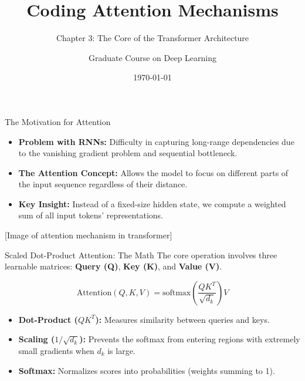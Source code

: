 \documentclass[aspectratio=169]{beamer}
\title{Coding Attention Mechanisms}
\subtitle{Chapter 3: The Core of the Transformer Architecture}
\author{Graduate Course on Deep Learning}
\date{\today}
\institute{Instituto Politécnico Nacional (IPN)}
\begin{document}
	
	\maketitle
	
	\begin{frame}{The Motivation for Attention}
		\begin{itemize}
			\item \textbf{Problem with RNNs:} Difficulty in capturing long-range dependencies due to the vanishing gradient problem and sequential bottleneck.
			\item \textbf{The Attention Concept:} Allows the model to focus on different parts of the input sequence regardless of their distance.
			\item \textbf{Key Insight:} Instead of a fixed-size hidden state, we compute a weighted sum of all input tokens' representations.
		\end{itemize}
		[Image of attention mechanism in transformer]
	\end{frame}
	
	\begin{frame}{Scaled Dot-Product Attention: The Math}
		The core operation involves three learnable matrices: \textbf{Query (Q)}, \textbf{Key (K)}, and \textbf{Value (V)}.
		
		\begin{equation}
			\text{Attention}(Q, K, V) = \text{softmax}\left( \frac{QK^T}{\sqrt{d_k}} \right)V
		\end{equation}
		
		\begin{itemize}
			\item \textbf{Dot-Product ($QK^T$):} Measures similarity between queries and keys.
			\item \textbf{Scaling ($1/\sqrt{d_k}$):} Prevents the softmax from entering regions with extremely small gradients when $d_k$ is large.
			\item \textbf{Softmax:} Normalizes scores into probabilities (weights summing to 1).
		\end{itemize}
	\end{frame}
	
\end{document}
